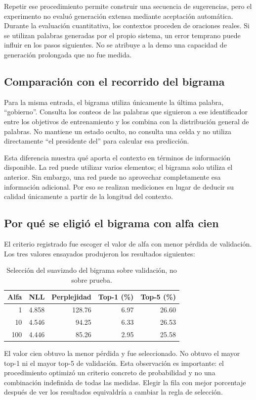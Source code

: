 Repetir ese procedimiento permite construir una secuencia de sugerencias, pero el experimento no evaluó generación extensa mediante aceptación automática. Durante la evaluación cuantitativa, los contextos proceden de oraciones reales. Si se utilizan palabras generadas por el propio sistema, un error temprano puede influir en los pasos siguientes. No se atribuye a la demo una capacidad de generación prolongada que no fue medida.

\subsection{Comparación con el recorrido del bigrama}
Para la misma entrada, el bigrama utiliza únicamente la última palabra, ``gobierno''. Consulta los conteos de las palabras que siguieron a ese identificador entre los objetivos de entrenamiento y los combina con la distribución general de palabras. No mantiene un estado oculto, no consulta una celda y no utiliza directamente ``el presidente del'' para calcular esa predicción.

Esta diferencia muestra qué aporta el contexto en términos de información disponible. La red puede utilizar varios elementos; el bigrama solo utiliza el anterior. Sin embargo, una red puede no aprovechar completamente esa información adicional. Por eso se realizan mediciones en lugar de deducir su calidad únicamente a partir de la longitud del contexto.

\subsection{Por qué se eligió el bigrama con alfa cien}
El criterio registrado fue escoger el valor de alfa con menor pérdida de validación. Los tres valores ensayados produjeron los resultados siguientes:
\begin{table}[tb]
\caption{Selección del suavizado del bigrama sobre validación, no sobre prueba.}
\centering
\begin{tabular}{rrrrr}
\toprule Alfa & NLL & Perplejidad & Top-1 (\%) & Top-5 (\%)\\\midrule
1 & 4.858 & 128.76 & 6.97 & 26.60\\
10 & 4.546 & 94.25 & 6.33 & 26.53\\
100 & 4.446 & 85.26 & 2.95 & 25.58\\\bottomrule
\end{tabular}
\end{table}

El valor cien obtuvo la menor pérdida y fue seleccionado. No obtuvo el mayor top-1 ni el mayor top-5 de validación. Esta observación es importante: el procedimiento optimizó un criterio concreto de probabilidad y no una combinación indefinida de todas las medidas. Elegir la fila con mejor porcentaje después de ver los resultados equivaldría a cambiar la regla de selección.

